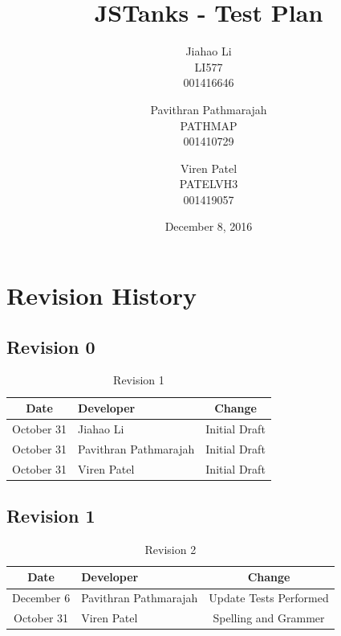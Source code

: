 \documentclass{article}
\begin{document}
\newpage
\title{JSTanks - Test Plan}
\date{December 8, 2016}
\author{Jiahao Li\\LI577\\001416646\and Pavithran Pathmarajah\\PATHMAP\\
001410729 \and Viren Patel\\PATELVH3\\001419057}

\maketitle

\newpage
{}
\tableofcontents
\newpage
\listoftables

\newpage
\listoffigures

\newpage
\section{Revision History}
\subsection{Revision 0}
\begin{table}[H]
\caption{Revision 1}
	\begin{tabularx}{\textwidth}{cXc}
		\toprule
		Date & Developer & Change\\
		\midrule
		October 31&Jiahao Li &Initial Draft \\
		October 31&Pavithran Pathmarajah &Initial Draft\\
		October 31&Viren Patel  &Initial Draft\\
	\end{tabularx}
\end{table}

\subsection{Revision 1}
\begin{table}[H]
\caption{Revision 2}
	\begin{tabularx}{\textwidth}{cXc}
		\toprule
		Date & Developer & Change\\
		\midrule
		December 6&Pavithran Pathmarajah & Update Tests Performed\\
		October 31&Viren Patel  &Spelling and Grammer\\
	\end{tabularx}
\end{table}
\end{document}

